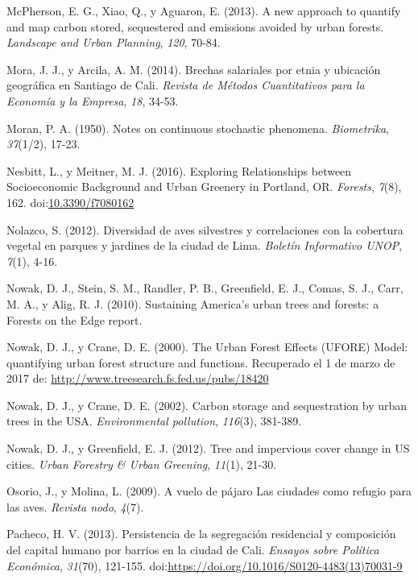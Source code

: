 \documentclass[12pt,a4paper,openany]{book}
\theoremstyle{definition}
\theoremstyle{definition}
\theoremstyle{definition}
\theoremstyle{remark}
\begin{document}
\hypertarget{ref-mcpherson2013new}{}
McPherson, E. G., Xiao, Q., y Aguaron, E. (2013). A new approach to
quantify and map carbon stored, sequestered and emissions avoided by
urban forests. \emph{Landscape and Urban Planning}, \emph{120}, 70-84.

\hypertarget{ref-mora_brechas_2014}{}
Mora, J. J., y Arcila, A. M. (2014). Brechas salariales por etnia y
ubicación geográfica en Santiago de Cali. \emph{Revista de Métodos
Cuantitativos para la Economía y la Empresa}, \emph{18}, 34-53.

\hypertarget{ref-moran1950notes}{}
Moran, P. A. (1950). Notes on continuous stochastic phenomena.
\emph{Biometrika}, \emph{37}(1/2), 17-23.

\hypertarget{ref-nesbitt_exploring_2016}{}
Nesbitt, L., y Meitner, M. J. (2016). Exploring Relationships between
Socioeconomic Background and Urban Greenery in Portland, OR.
\emph{Forests}, \emph{7}(8), 162.
doi:\href{https://doi.org/10.3390/f7080162}{10.3390/f7080162}

\hypertarget{ref-nolazco_diversidad_2012}{}
Nolazco, S. (2012). Diversidad de aves silvestres y correlaciones con la
cobertura vegetal en parques y jardines de la ciudad de Lima.
\emph{Boletín Informativo UNOP}, \emph{7}(1), 4-16.

\hypertarget{ref-nowak_sustaining_2010}{}
Nowak, D. J., Stein, S. M., Randler, P. B., Greenfield, E. J., Comas, S.
J., Carr, M. A., y Alig, R. J. (2010). Sustaining America's urban trees
and forests: a Forests on the Edge report.

\hypertarget{ref-nowak_urban_2000}{}
Nowak, D. J., y Crane, D. E. (2000). The Urban Forest Effects (UFORE)
Model: quantifying urban forest structure and functions. Recuperado el 1
de marzo de 2017 de: \url{http://www.treesearch.fs.fed.us/pubs/18420}

\hypertarget{ref-nowak_carbon_2002}{}
Nowak, D. J., y Crane, D. E. (2002). Carbon storage and sequestration by
urban trees in the USA. \emph{Environmental pollution}, \emph{116}(3),
381-389.

\hypertarget{ref-nowak_tree_2012}{}
Nowak, D. J., y Greenfield, E. J. (2012). Tree and impervious cover
change in US cities. \emph{Urban Forestry \& Urban Greening},
\emph{11}(1), 21-30.

\hypertarget{ref-osorio_vuelo_2009}{}
Osorio, J., y Molina, L. (2009). A vuelo de pájaro Las ciudades como
refugio para las aves. \emph{Revista nodo}, \emph{4}(7).

\hypertarget{ref-PACHECO2013121}{}
Pacheco, H. V. (2013). Persistencia de la segregación residencial y
composición del capital humano por barrios en la ciudad de Cali.
\emph{Ensayos sobre Política Económica}, \emph{31}(70), 121-155.
doi:\href{https://doi.org/https://doi.org/10.1016/S0120-4483(13)70031-9}{https://doi.org/10.1016/S0120-4483(13)70031-9}
\end{document}
